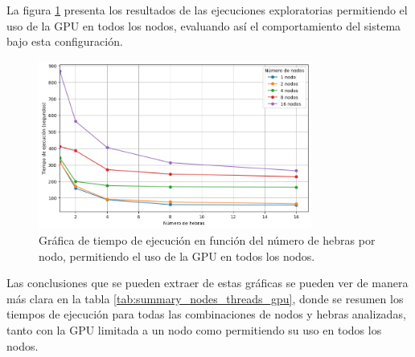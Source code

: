La figura \ref{fig:exploratory_gpu_no-limit_time} presenta los resultados de las ejecuciones exploratorias permitiendo el uso de la GPU en todos los nodos, evaluando así el comportamiento del sistema bajo esta configuración.

\begin{figure}[ht]
    \centering
    \includegraphics[width=0.8\textwidth]{imagenes/cap5/exploratory_gpu_no-limit_time.png}
    \caption{Gráfica de tiempo de ejecución en función del número de hebras por nodo, permitiendo el uso de la GPU en todos los nodos.}
    \label{fig:exploratory_gpu_no-limit_time}
\end{figure}

Las conclusiones que se pueden extraer de estas gráficas se pueden ver de manera más clara en la tabla \ref{tab:summary_nodes_threads_gpu}, donde se resumen los tiempos de ejecución para todas las combinaciones de nodos y hebras analizadas, tanto con la GPU limitada a un nodo como permitiendo su uso en todos los nodos.

